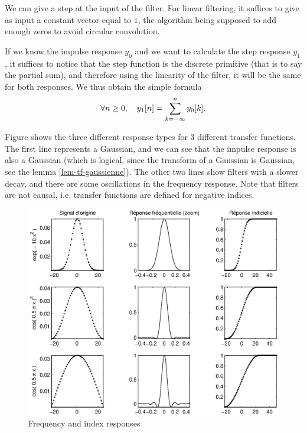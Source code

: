 \begin{rs}
\item {} We can give a step at the input of the filter. For linear filtering, it suffices to give as input a constant vector equal to $ 1 $, the algorithm being supposed to add enough zeros to avoid circular convolution.
\item If we know the impulse response $ y_0 $ and we want to calculate the step response $ y_1 $, it suffices to notice that the step function is the discrete primitive (that is to say the partial sum), and therefore using the linearity of the filter, it will be the same for both responses. We thus obtain the simple formula
\begin{equation*}
\forall n \geq 0, \quad y_1 [n] = \sum_{k = -\infty}^{n}{y_0 [k]}.
\end{equation*}
\end{rs} 
Figure  shows the three different response types for 3 different transfer functions. The first line represents a Gaussian, and we can see that the impulse response is also a Gaussian (which is logical, since the transform of a Gaussian is Gaussian, see the lemma \ref{lem-tf-gaussienne}). The other two lines show filters with a slower decay, and there are some oscillations in the frequency response. Note that filters are not causal, i.e. transfer functions are defined for negative indices. 

\begin{figure}[ht]
    \begin{center}
    \includegraphics[scale=0.7]{images/diff-types-reponses.eps}
    \end{center}
    \caption{Frequency and index responses}
              \label{fig-diff-types-responses}
\end{figure}
 
